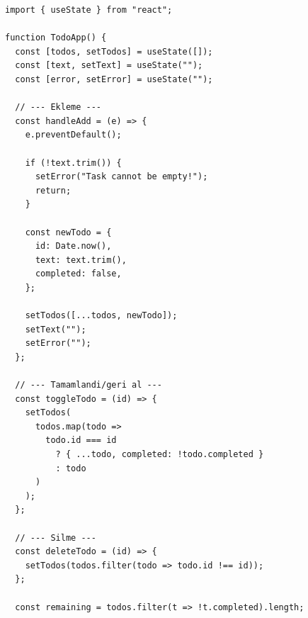 \documentclass[12pt, a4paper]{article}
\begin{document}
\begin{tcolorbox}[enhanced, colback=codebg, colframe=gray!30,
    colbacktitle=primary!85!black, coltitle=white, arc=4pt,
    title={\sffamily\bfseries\small TodoApp.jsx}]
\begin{lstlisting}[style=jsxstyle]
import { useState } from "react";

function TodoApp() {
  const [todos, setTodos] = useState([]);
  const [text, setText] = useState("");
  const [error, setError] = useState("");

  // --- Ekleme ---
  const handleAdd = (e) => {
    e.preventDefault();

    if (!text.trim()) {
      setError("Task cannot be empty!");
      return;
    }

    const newTodo = {
      id: Date.now(),
      text: text.trim(),
      completed: false,
    };

    setTodos([...todos, newTodo]);
    setText("");
    setError("");
  };

  // --- Tamamlandi/geri al ---
  const toggleTodo = (id) => {
    setTodos(
      todos.map(todo =>
        todo.id === id
          ? { ...todo, completed: !todo.completed }
          : todo
      )
    );
  };

  // --- Silme ---
  const deleteTodo = (id) => {
    setTodos(todos.filter(todo => todo.id !== id));
  };

  const remaining = todos.filter(t => !t.completed).length;
\end{lstlisting}
\end{tcolorbox}

\vspace{4pt}
\end{document}
